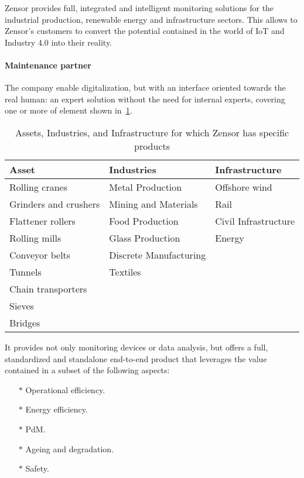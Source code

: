 
Zensor \cite{Misc:zensor_official_website} provides full, integrated and intelligent monitoring solutions for the industrial production, renewable energy and infrastructure sectors.
This allows to Zensor's customers to convert the potential contained in the world of \ac{IoT} and Industry 4.0 into their reality.

\paragraph{Maintenance partner}
The company enable digitalization, but with an interface oriented towards the real human: an expert solution without the need for internal experts, covering one or more of element shown in~\ref{tab:assets_zensors}.
\begin{table}[h]
    \begin{tabularx}{\textwidth}{l l l}
        \toprule
        Asset                 & Industries             & Infrastructure       \\ \midrule
        Rolling cranes        & Metal Production       & Offshore wind        \\
        Grinders and crushers & Mining and Materials   & Rail                 \\
        Flattener rollers     & Food Production        & Civil Infrastructure \\
        Rolling mills         & Glass Production       & Energy               \\
        Conveyor belts        & Discrete Manufacturing                        \\
        Tunnels               & Textiles                                      \\
        Chain transporters    &                                               \\
        Sieves                &                                               \\
        Bridges               &                                               \\ \bottomrule
    \end{tabularx}
    \caption{Assets, Industries, and Infrastructure for which Zensor has specific products}
    \label{tab:assets_zensors}
\end{table}

It provides not only monitoring devices or data analysis, but offers a full, standardized and standalone end-to-end product that leverages the value contained in a subset of the following aspects:
\begin{multicols}{2}
    \begin{itemize}
        \item[$\ast$] Operational efficiency.
        \item[$\ast$] Energy efficiency.
        \item[$\ast$] \acl{PdM}.
        \item[$\ast$] Ageing and degradation.
        \item[$\ast$] Safety.
    \end{itemize}
\end{multicols}

